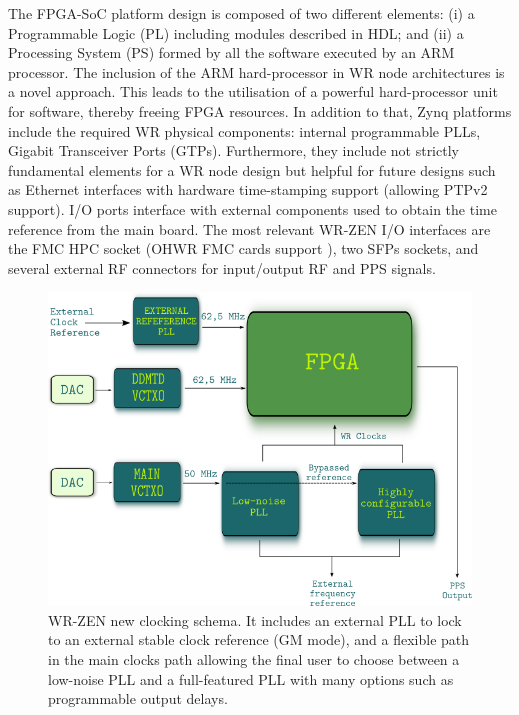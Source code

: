 The FPGA-SoC platform design is composed of two different elements: (i) a
Programmable Logic (PL) including modules described in HDL; and (ii) a
Processing System (PS) formed by all the software executed by an ARM
processor.  The inclusion of the ARM hard-processor in WR node
architectures is a novel approach.  This leads to the utilisation of a powerful
hard-processor unit for software, thereby freeing FPGA resources. In addition
to that, Zynq platforms include the required WR physical components: 
internal programmable PLLs, Gigabit Transceiver Ports (GTPs).
Furthermore, they include not strictly fundamental elements for a WR node design but helpful for future designs such as Ethernet interfaces with hardware time-stamping support (allowing PTPv2 support). I/O ports interface with external components used to obtain the time reference from the
main board. The most relevant WR-ZEN I/O interfaces are the FMC HPC
socket (OHWR FMC cards support \cite{ohwr:fmc-fine-delay}), two SFPs sockets, and several external RF connectors for input/output RF and PPS signals.

\begin{figure} \centering
	\includegraphics[width=0.7\linewidth]{img/zenclkschema} \caption[WR-ZEN
	clocking schema]{WR-ZEN new clocking schema. 
	It includes an external PLL to lock to an external
	stable clock reference (GM mode), and a flexible path in the main
	clocks path allowing the final user to choose between a low-noise PLL
	and a full-featured PLL with many options such as programmable output
delays.} \label{fig:zenclkschema} \end{figure}

